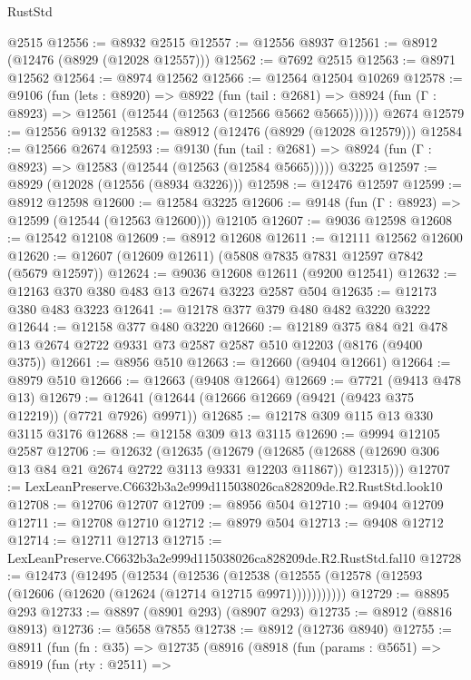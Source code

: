 \begin{lexlean}{RustStd}
\begin{coremodule}
    @2515
@12556 := @8932 @2515
@12557 := @12556 @8937
@12561 := @8912 (@12476 (@8929 (@12028 @12557)))
@12562 := @7692 @2515
@12563 := @8971 @12562
@12564 := @8974 @12562
@12566 := @12564 @12504 @10269
@12578 := @9106
    (fun (lets : @8920) =>
    @8922
      (fun (tail : @2681) =>
      @8924 (fun (Γ : @8923) => @12561 (@12544 (@12563 (@12566 @5662 @5665))))))
    @2674
@12579 := @12556 @9132
@12583 := @8912 (@12476 (@8929 (@12028 @12579)))
@12584 := @12566 @2674
@12593 := @9130
    (fun (tail : @2681) => @8924 (fun (Γ : @8923) => @12583 (@12544 (@12563 (@12584 @5665)))))
    @3225
@12597 := @8929 (@12028 (@12556 (@8934 @3226)))
@12598 := @12476 @12597
@12599 := @8912 @12598
@12600 := @12584 @3225
@12606 := @9148 (fun (Γ : @8923) => @12599 (@12544 (@12563 @12600))) @12105
@12607 := @9036 @12598
@12608 := @12542 @12108
@12609 := @8912 @12608
@12611 := @12111 @12562 @12600
@12620 := @12607 (@12609 @12611) (@5808 @7835 @7831 @12597 @7842 (@5679 @12597))
@12624 := @9036 @12608 @12611 (@9200 @12541)
@12632 := @12163 @370 @380 @483 @13 @2674 @3223 @2587 @504
@12635 := @12173 @380 @483 @3223
@12641 := @12178 @377 @379 @480 @482 @3220 @3222
@12644 := @12158 @377 @480 @3220
@12660 := @12189
    @375
    @84
    @21
    @478
    @13
    @2674
    @2722
    @9331
    @73
    @2587
    @2587
    @510
    @12203
    (@8176 (@9400 @375))
@12661 := @8956 @510
@12663 := @12660 (@9404 @12661)
@12664 := @8979 @510
@12666 := @12663 (@9408 @12664)
@12669 := @7721 (@9413 @478 @13)
@12679 := @12641 (@12644 (@12666 @12669 (@9421 (@9423 @375 @12219)) (@7721 @7926) @9971))
@12685 := @12178 @309 @115 @13 @330 @3115 @3176
@12688 := @12158 @309 @13 @3115
@12690 := @9994 @12105 @2587
@12706 := @12632
    (@12635
      (@12679
        (@12685 (@12688 (@12690 @306 @13 @84 @21 @2674 @2722 @3113 @9331 @12203 @11867)) @12315)))
@12707 := LexLeanPreserve.C6632b3a2e999d115038026ca828209de.R2.RustStd.look10
@12708 := @12706 @12707
@12709 := @8956 @504
@12710 := @9404 @12709
@12711 := @12708 @12710
@12712 := @8979 @504
@12713 := @9408 @12712
@12714 := @12711 @12713
@12715 := LexLeanPreserve.C6632b3a2e999d115038026ca828209de.R2.RustStd.fal10
@12728 := @12473
    (@12495
      (@12534
        (@12536
          (@12538 (@12555 (@12578 (@12593 (@12606 (@12620 (@12624 (@12714 @12715 @9971)))))))))))
@12729 := @8895 @293
@12733 := @8897 (@8901 @293) (@8907 @293)
@12735 := @8912 (@8816 @8913)
@12736 := @5658 @7855
@12738 := @8912 (@12736 @8940)
@12755 := @8911
    (fun (fn : @35) =>
    @12735
      (@8916
        (@8918
          (fun (params : @5651) =>
          @8919
            (fun (rty : @2511) =>

\end{coremodule}
\end{lexlean}
